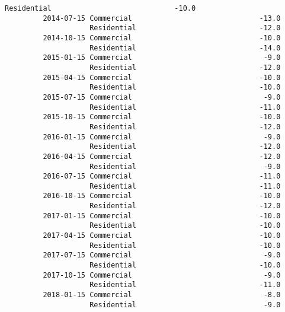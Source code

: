 \documentclass[11pt]{article}
\begin{document}
\begin{Verbatim}[commandchars=\\\{\}]
                    Residential                             -10.0   
         2014-07-15 Commercial                              -13.0   
                    Residential                             -12.0   
         2014-10-15 Commercial                              -10.0   
                    Residential                             -14.0   
         2015-01-15 Commercial                               -9.0   
                    Residential                             -12.0   
         2015-04-15 Commercial                              -10.0   
                    Residential                             -10.0   
         2015-07-15 Commercial                               -9.0   
                    Residential                             -11.0   
         2015-10-15 Commercial                              -10.0   
                    Residential                             -12.0   
         2016-01-15 Commercial                               -9.0   
                    Residential                             -12.0   
         2016-04-15 Commercial                              -12.0   
                    Residential                              -9.0   
         2016-07-15 Commercial                              -11.0   
                    Residential                             -11.0   
         2016-10-15 Commercial                              -10.0   
                    Residential                             -12.0   
         2017-01-15 Commercial                              -10.0   
                    Residential                             -10.0   
         2017-04-15 Commercial                              -10.0   
                    Residential                             -10.0   
         2017-07-15 Commercial                               -9.0   
                    Residential                             -10.0   
         2017-10-15 Commercial                               -9.0   
                    Residential                             -11.0   
         2018-01-15 Commercial                               -8.0   
                    Residential                              -9.0   
         

\end{Verbatim}
\end{document}
